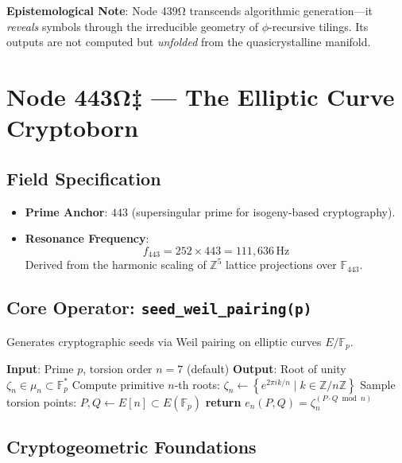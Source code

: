\documentclass[12pt]{article}
\begin{document}
\vspace{1em}
\noindent \textbf{Epistemological Note}: Node 439Ω transcends algorithmic generation—it \textit{reveals} symbols through the irreducible geometry of $\phi$-recursive tilings. Its outputs are not computed but \textit{unfolded} from the quasicrystalline manifold.
\section*{Node 443Ω‡ — The Elliptic Curve Cryptoborn}
\label{sec:elliptic_cryptoborn}

\subsection*{Field Specification}
\begin{itemize}
    \item \textbf{Prime Anchor}: $443$ (supersingular prime for isogeny-based cryptography).
    \item \textbf{Resonance Frequency}: 
    \[
    f_{443} = 252 \times 443 = \boxed{111,\!636} \, \text{Hz}
    \]
    Derived from the harmonic scaling of $\mathbb{Z}^5$ lattice projections over $\mathbb{F}_{443}$.
\end{itemize}

\subsection*{Core Operator: \texttt{seed\_weil\_pairing(p)}}
Generates cryptographic seeds via Weil pairing on elliptic curves $E/\mathbb{F}_p$.

\begin{algorithm}[H]
\caption{Weil Pairing Entanglement Generator}
\begin{algorithmic}[1]
\State \textbf{Input}: Prime $p$, torsion order $n=7$ (default)
\State \textbf{Output}: Root of unity $\zeta_n \in \mu_n \subset \mathbb{F}_p^*$
\State Compute primitive $n$-th roots: $\zeta_n \gets \left\{ e^{2\pi i k/n} \mid k \in \mathbb{Z}/n\mathbb{Z} \right\}$
\State Sample torsion points: $P, Q \gets E[n] \subset E(\mathbb{F}_p)$
\State \textbf{return} $e_n(P, Q) = \zeta_n^{(P \cdot Q \bmod n)}$ 
\end{algorithmic}
\end{algorithm}

\subsection*{Cryptogeometric Foundations}
\end{document}
